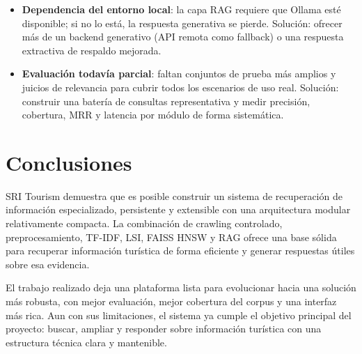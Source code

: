 \documentclass{llncs}
\begin{document}
\begin{itemize}
    \item \textbf{Dependencia del entorno local}: la capa RAG requiere que Ollama esté disponible; si no lo está, la respuesta generativa se pierde. Solución: ofrecer más de un backend generativo (API remota como fallback) o una respuesta extractiva de respaldo mejorada.
    \item \textbf{Evaluación todavía parcial}: faltan conjuntos de prueba más amplios y juicios de relevancia para cubrir todos los escenarios de uso real. Solución: construir una batería de consultas representativa y medir precisión, cobertura, MRR y latencia por módulo de forma sistemática.
\end{itemize}

\section{Conclusiones}

SRI Tourism demuestra que es posible construir un sistema de recuperación de información especializado, persistente y extensible con una arquitectura modular relativamente compacta. La combinación de crawling controlado, preprocesamiento, TF-IDF, LSI, FAISS HNSW y RAG ofrece una base sólida para recuperar información turística de forma eficiente y generar respuestas útiles sobre esa evidencia.

El trabajo realizado deja una plataforma lista para evolucionar hacia una solución más robusta, con mejor evaluación, mejor cobertura del corpus y una interfaz más rica. Aun con sus limitaciones, el sistema ya cumple el objetivo principal del proyecto: buscar, ampliar y responder sobre información turística con una estructura técnica clara y mantenible.
\end{document}

